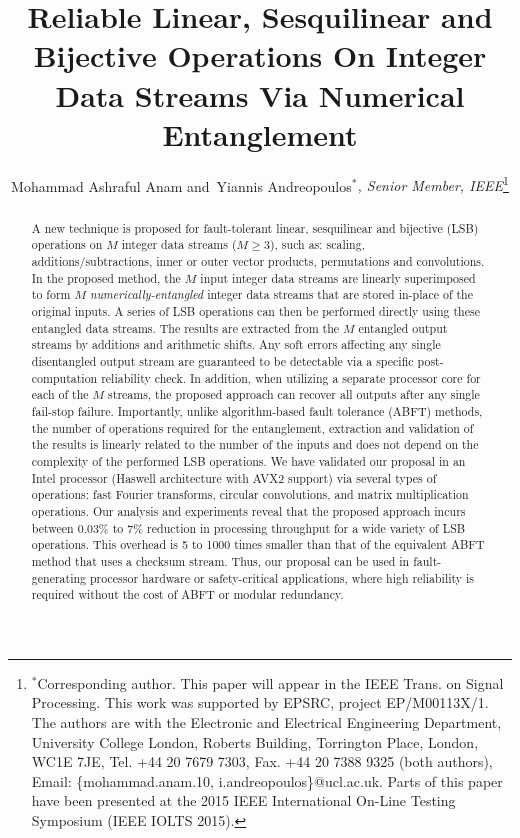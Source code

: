\documentclass[twocolumn,english,onecolumn]{IEEEtran}
\theoremstyle{plain}
\theoremstyle{plain}
\begin{document}
\title{Reliable Linear, Sesquilinear and Bijective Operations On Integer
Data Streams Via Numerical Entanglement}


\author{Mohammad Ashraful Anam and~Yiannis Andreopoulos\emph{$^{*}$, Senior
Member, IEEE}\thanks{$^{*}$Corresponding author. This paper will appear in the IEEE Trans. on Signal Processing. This work was supported by EPSRC, project
EP/M00113X/1. The authors are with the Electronic and Electrical Engineering
Department, University College London, Roberts Building, Torrington
Place, London, WC1E 7JE, Tel. +44 20 7679 7303, Fax. +44 20 7388 9325
(both authors), Email: \{mohammad.anam.10, i.andreopoulos\}@ucl.ac.uk.
Parts of this paper have been presented at the 2015 IEEE International
On-Line Testing Symposium (IEEE IOLTS 2015). }}
\maketitle
\begin{abstract}
A new technique is proposed for fault-tolerant linear, sesquilinear
and bijective (LSB) operations on $M$ integer data streams ($M\geq3$),
such as: scaling, additions/subtractions, inner or outer vector products,
permutations and convolutions. In the proposed method, the $M$ input
integer data streams are linearly superimposed to form $M$ \emph{numerically-entangled}
integer data streams that are stored in-place of the original inputs.
A series of LSB operations can then be performed directly using these
entangled data streams. The results are extracted from the $M$ entangled
output streams by additions and arithmetic shifts. Any soft errors
affecting any single disentangled output stream are guaranteed to
be detectable via a specific post-computation reliability check. In
addition, when utilizing a separate processor core for each of the
$M$ streams, the proposed approach can recover all outputs after
any single fail-stop failure. Importantly, unlike algorithm-based
fault tolerance (ABFT) methods, the number of operations required
for the entanglement, extraction and validation of the results is
linearly related to the number of the inputs and does not depend on
the complexity of the performed LSB operations. We have validated
our proposal in an Intel processor (Haswell architecture with AVX2
support) via several types of operations: fast Fourier transforms,
circular convolutions, and matrix multiplication operations. Our analysis
and experiments reveal that the proposed approach incurs between $0.03\%$
to $7\%$ reduction in processing throughput for a wide variety of
LSB operations. This overhead is 5 to 1000 times smaller than that
of the equivalent ABFT method that uses a checksum stream. Thus, our
proposal can be used in fault-generating processor hardware or safety-critical
applications, where high reliability is required without the cost
of ABFT or modular redundancy. \end{abstract}
\end{document}
